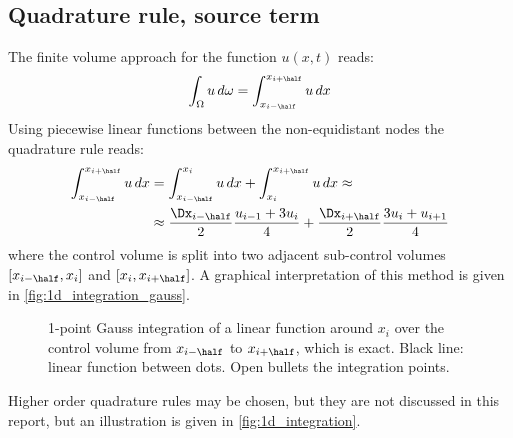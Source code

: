 \subsection{Quadrature rule, source term}\label{sec:source_quadrature_rule}
The finite volume approach for the function $u(x,t)$ reads:
\begin{align}
    \int_\Omega u \, d\omega = \int_{x_{i-\half}}^{x_{i+\half}} u \, dx
\end{align}
Using piecewise linear functions between the non-equidistant nodes the quadrature rule reads:
\begin{align}
    \int_{x_{i-\half}}^{x_{i+\half}} u \, dx & = \int_{x_{i-\half}}^{x_i} u \, dx + \int_{x_i}^{x_{i+\half}} u \, dx \approx
    \\
    & \approx \frac{\Dx_{i-\half}}{2} \frac{u_{i-1} + 3 u_{i}}{4} + \frac{\Dx_{i+\half}}{2} \frac{3 u_{i} + u_{i+1}}{4} \label{eq:integral_control_volume}
\end{align}
where the control volume is split into two adjacent sub-control volumes  $[x_{i-\half}, x_i]$ and $[x_i, x_{i+\half}]$.
A graphical interpretation of this method is given in \autoref{fig:1d_integration_gauss}.
\begin{figure}[H]
        \begin{center}
        \end{center}
    \caption[Illustration of the 1-point Gauss integration method of a linear functions.]{1-point Gauss integration of a linear function around $x_i$ over the control volume from $x_{i-\half}$ to $x_{i+\half}$, which is exact.  Black line: linear function between dots. Open bullets the integration points. }\label{fig:1d_integration_gauss}
\end{figure}
Higher order quadrature rules may be chosen, but they are not discussed in this report, but an illustration is given in \autoref{fig:1d_integration}.
